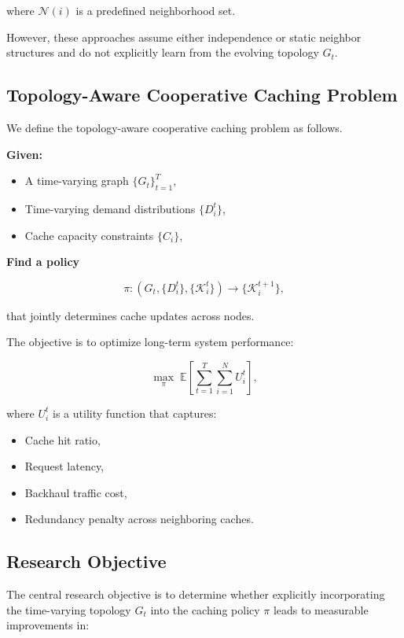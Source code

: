 where $\mathcal{N}(i)$ is a predefined neighborhood set.

However, these approaches assume either independence or static neighbor structures and do not explicitly learn from the evolving topology $G_t$.

\subsection{Topology-Aware Cooperative Caching Problem}

We define the topology-aware cooperative caching problem as follows.

\textbf{Given:}
\begin{itemize}
    \item A time-varying graph $\{G_t\}_{t=1}^{T}$,
    \item Time-varying demand distributions $\{D_i^t\}$,
    \item Cache capacity constraints $\{C_i\}$,
\end{itemize}

\textbf{Find a policy}

\begin{equation}
\pi : (G_t, \{D_i^t\}, \{\mathcal{K}_i^t\})
\rightarrow
\{\mathcal{K}_i^{t+1}\},
\end{equation}

that jointly determines cache updates across nodes.

The objective is to optimize long-term system performance:

\begin{equation}
\max_{\pi}
\; \mathbb{E}
\left[
\sum_{t=1}^{T}
\sum_{i=1}^{N}
U_i^t
\right],
\end{equation}

where $U_i^t$ is a utility function that captures:

\begin{itemize}
    \item Cache hit ratio,
    \item Request latency,
    \item Backhaul traffic cost,
    \item Redundancy penalty across neighboring caches.
\end{itemize}

\subsection{Research Objective}

The central research objective is to determine whether explicitly incorporating the time-varying topology $G_t$ into the caching policy $\pi$ leads to measurable improvements in:

